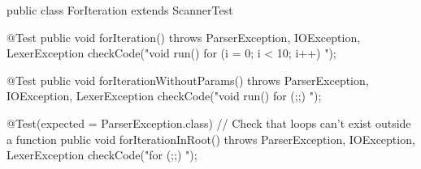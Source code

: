 public class ForIteration extends ScannerTest {
    @Test
    public void forIteration() throws ParserException, IOException, LexerException {
        checkCode("void run() { for (i = 0; i < 10; i++) { } }");
    }

    @Test
    public void forIterationWithoutParams() throws ParserException, IOException, LexerException {
        checkCode("void run() { for (;;) { } }");
    }

    @Test(expected = ParserException.class)
    // Check that loops can't exist outside a function
    public void forIterationInRoot() throws ParserException, IOException, LexerException {
        checkCode("for (;;) { }");
    }
}